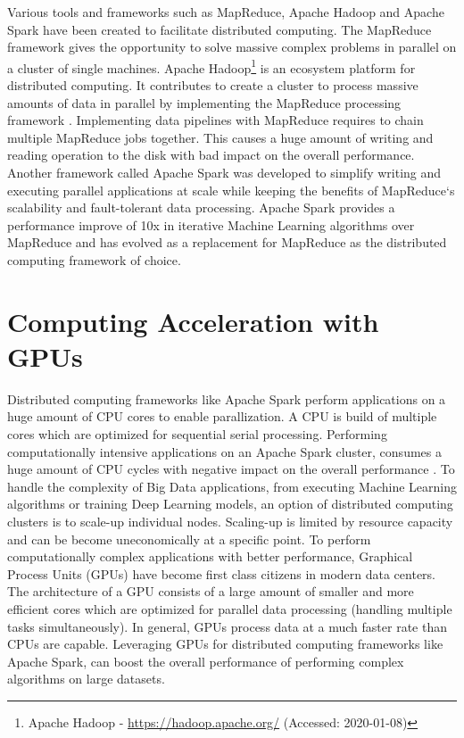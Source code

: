 Various tools and frameworks such as MapReduce, Apache Hadoop and Apache Spark have been created to facilitate distributed computing.
The MapReduce\cite{Dean2004MapReduce} framework gives the opportunity to solve massive complex problems in parallel on a cluster of single machines.
Apache Hadoop\footnote{Apache Hadoop - \url{https://hadoop.apache.org/} (Accessed: 2020-01-08)} is an ecosystem platform for distributed computing. It contributes to create a cluster to process massive amounts of data in parallel by implementing the MapReduce processing framework \cite{Khattak2016BigData}.
Implementing data pipelines with MapReduce requires to chain multiple MapReduce jobs together. This causes a huge amount of writing and reading operation to the disk with bad impact on the overall performance. Another framework called Apache Spark was developed to simplify writing and executing parallel applications at scale while keeping the benefits of MapReduce`s scalability and fault-tolerant data processing. Apache Spark provides a performance improve of 10x in iterative Machine Learning algorithms over MapReduce \cite{Zaharia2010Spark} and has evolved as a replacement for MapReduce as the distributed computing framework of choice.


\section{Computing Acceleration with GPUs}
Distributed computing frameworks like Apache Spark perform applications on a huge amount of CPU cores to enable parallization. A CPU is build of multiple cores which are optimized for sequential serial processing. Performing computationally intensive applications on an Apache Spark cluster, consumes a huge amount of CPU cycles with negative impact on the overall performance \cite{Li2015HeteroSpark}.
To handle the complexity of Big Data applications, from executing Machine Learning algorithms or training Deep Learning models, an option of distributed computing clusters is to scale-up individual nodes. Scaling-up is limited by resource capacity and can be become uneconomically at a specific point.
To perform computationally complex applications with better performance, Graphical Process Units (GPUs) have become first class citizens in modern data centers. The architecture of a GPU consists of a large amount of smaller and more efficient cores which are optimized for parallel data processing (handling multiple tasks simultaneously). In general, GPUs process data at a much faster rate than CPUs are capable.
Leveraging GPUs for distributed computing frameworks like Apache Spark, can boost the overall performance of performing complex algorithms on large datasets.


